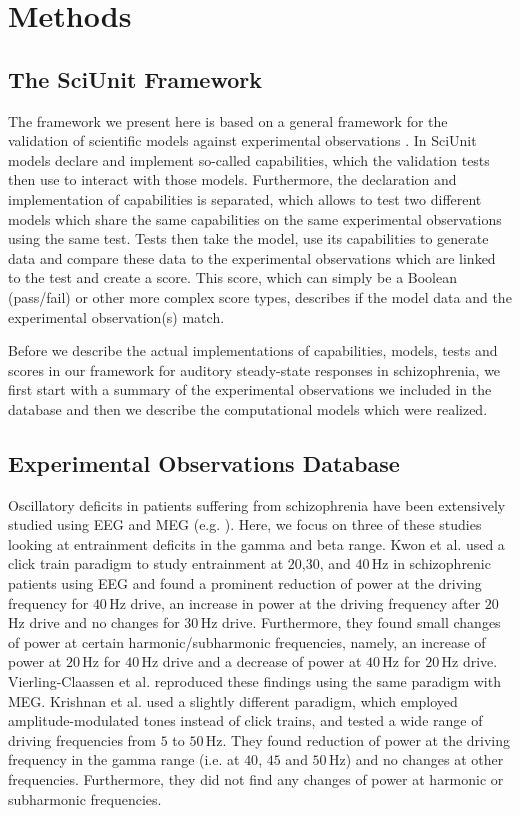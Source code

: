 \documentclass[a4paper,10pt]{article}
\begin{document}
\section{Methods}

\subsection{The SciUnit Framework}
The framework we present here is based on a general framework for the validation of scientific models against 
experimental observations \cite{Omar2014}.
In SciUnit models declare and implement so-called capabilities, which the validation tests then use to 
interact with those models. Furthermore, the declaration
and implementation of capabilities is separated, which allows to test two different models which share the 
same capabilities on the same experimental observations using
the same test. Tests then take the model, use its capabilities to generate data and compare these data to the 
experimental observations which are linked to the test
and create a score. This score, which can simply be a Boolean (pass/fail) or other more complex score types, 
describes if the model data and the experimental observation(s) match.

Before we describe the actual implementations of capabilities, models, tests and scores in our framework for 
auditory steady-state responses in schizophrenia,
we first start with a summary of the experimental observations we included in the database and 
then we describe the computational models which were realized.

\subsection{Experimental Observations Database}

Oscillatory deficits in patients suffering from schizophrenia have been extensively studied using EEG and MEG (e.g.  \cite{Kwon1999,Vierling2008,Krishnan2009,
Light2006,Zhang2016,Hamm2015,Brenner2003,Spencer2009b,Spencer2008,Spencer2012,OConnell2015, Mulert2011}). Here, we focus on three of these studies looking at
entrainment deficits in the gamma and beta range. Kwon et al. \cite{Kwon1999} used a click train paradigm to study entrainment at $20$,$30$, and $40$\,Hz in schizophrenic
patients using EEG and found a prominent reduction of power at the driving frequency for $40$\,Hz drive, an increase in power at the driving frequency after $20$\,Hz drive and 
no changes for $30$\,Hz drive. Furthermore, they found small changes of power at certain harmonic/subharmonic frequencies, namely, an increase of power at $20$\,Hz for $40$\,Hz
drive and a decrease of power at $40$\,Hz for $20$\,Hz drive. Vierling-Claassen et al. \cite{Vierling2008} reproduced these findings using the same paradigm with MEG. 
Krishnan et al. \cite{Krishnan2009} used a slightly different paradigm, which employed amplitude-modulated tones instead of click trains, and tested a wide range of driving 
frequencies from $5$ to $50$\,Hz. They found reduction of power at the driving frequency in the gamma range (i.e. at $40$, $45$ and $50$\,Hz) and no changes at other frequencies.
Furthermore, they did not find any changes of power at harmonic or subharmonic frequencies. 
\end{document}
